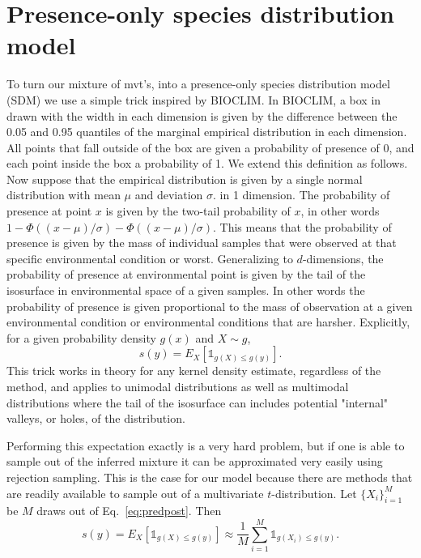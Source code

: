 \documentclass[11pt, oneside]{article}   	%
\begin{document}
\section{Presence-only species distribution model}
To turn our mixture of mvt's, into a presence-only species distribution model (SDM) we use a simple trick inspired by BIOCLIM. In BIOCLIM, a box in drawn with the width in each dimension is given by the difference between the 0.05 and 0.95 quantiles of the marginal empirical distribution in each dimension. All points that fall outside of the box are given a probability of presence of 0, and each point inside the box a probability of 1. We extend this definition as follows. Now suppose that the empirical distribution is given by a single normal distribution with mean $\mu$ and deviation $\sigma$. in 1 dimension. The probability of presence at point $x$ is given by the two-tail probability of $x$, in other words $1 - \Phi((x-\mu)/\sigma) - \Phi((x - \mu)/\sigma)$. This means that the probability of presence is given by the mass of individual samples that were observed at that specific environmental condition or worst. Generalizing to $d$-dimensions, the probability of presence at environmental point is given by the tail of the isosurface in environmental space of a given samples. In other words the probability of presence is given proportional to the mass of observation at a given environmental condition or environmental conditions that are harsher. Explicitly, for a given probability density $g(x)$ and $X\sim g$,
\begin{equation}
s(y) = E_X\left[\mathds{1}_{g(X) \le g(y)}\right].
\end{equation}
This trick works in theory for any kernel density estimate, regardless of the method, and applies to unimodal distributions as well as multimodal distributions where the tail of the isosurface can includes potential "internal" valleys, or holes, of the distribution.

Performing this expectation exactly is a very hard problem, but if one is able to sample out of the inferred mixture it can be approximated very easily using rejection sampling. This is the case for our model because there are methods that are readily available to sample out of a multivariate $t$-distribution. Let $\lbrace X_i\rbrace_{i=1}^M$ be $M$ draws out of Eq.~\ref{eq:predpost}. Then
$$s(y) = E_X\left[\mathds{1}_{g(X) \le g(y)}\right] \approx \frac{1}{M}\sum_{i=1}^M \mathds{1}_{g(X_i) \le g(y)}.$$
\end{document}

